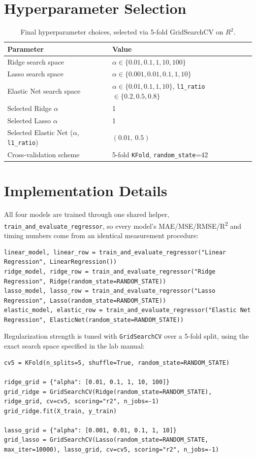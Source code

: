 \documentclass[11pt,a4paper]{article}
\begin{document}
\section{Hyperparameter Selection}
\begin{table}[h]
\centering
\begin{tabular}{ll}
\toprule
Parameter & Value \\
\midrule
Ridge search space & $\alpha \in \{0.01, 0.1, 1, 10, 100\}$ \\
Lasso search space & $\alpha \in \{0.001, 0.01, 0.1, 1, 10\}$ \\
Elastic Net search space & $\alpha \in \{0.01, 0.1, 1, 10\}$, \texttt{l1\_ratio} $\in \{0.2, 0.5, 0.8\}$ \\
Selected Ridge $\alpha$ & 1 \\
Selected Lasso $\alpha$ & 1 \\
Selected Elastic Net ($\alpha$, \texttt{l1\_ratio}) & $(0.01,\ 0.5)$ \\
Cross-validation scheme & 5-fold \texttt{KFold}, \texttt{random\_state}=42 \\
\bottomrule
\end{tabular}
\caption{Final hyperparameter choices, selected via 5-fold GridSearchCV on $R^2$.}
\end{table}

\section{Implementation Details}
All four models are trained through one shared helper, \texttt{train\_and\_evaluate\_regressor}, so every model's MAE/MSE/RMSE/R\textsuperscript{2} and timing numbers come from an identical measurement procedure:
\begin{lstlisting}
linear_model, linear_row = train_and_evaluate_regressor("Linear Regression", LinearRegression())
ridge_model, ridge_row = train_and_evaluate_regressor("Ridge Regression", Ridge(random_state=RANDOM_STATE))
lasso_model, lasso_row = train_and_evaluate_regressor("Lasso Regression", Lasso(random_state=RANDOM_STATE))
elastic_model, elastic_row = train_and_evaluate_regressor("Elastic Net Regression", ElasticNet(random_state=RANDOM_STATE))
\end{lstlisting}

Regularization strength is tuned with \texttt{GridSearchCV} over a 5-fold split, using the exact search space specified in the lab manual:
\begin{lstlisting}
cv5 = KFold(n_splits=5, shuffle=True, random_state=RANDOM_STATE)

ridge_grid = {"alpha": [0.01, 0.1, 1, 10, 100]}
grid_ridge = GridSearchCV(Ridge(random_state=RANDOM_STATE), ridge_grid, cv=cv5, scoring="r2", n_jobs=-1)
grid_ridge.fit(X_train, y_train)

lasso_grid = {"alpha": [0.001, 0.01, 0.1, 1, 10]}
grid_lasso = GridSearchCV(Lasso(random_state=RANDOM_STATE, max_iter=10000), lasso_grid, cv=cv5, scoring="r2", n_jobs=-1)
\end{lstlisting}
\end{document}
